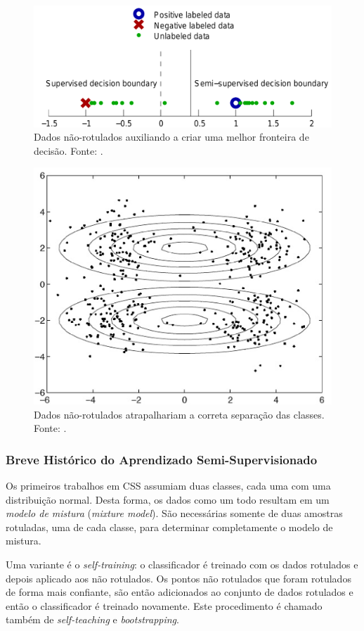\documentclass[12pt]{article}
\begin{document}
\begin{figure}[!h]
  \begin{center}
    \includegraphics[width=.45\textwidth]{ssl-help}
  \end{center}
  \caption{Dados não-rotulados auxiliando a criar uma melhor fronteira de decisão. Fonte: \cite{zhu1}.}
  \label{fig:help}
\end{figure}

\begin{figure}[!h]
  \begin{center}
    \includegraphics[width=.45\textwidth]{ssl-nhelp}
  \end{center}
  \caption{Dados não-rotulados atrapalhariam a correta separação das classes. Fonte: \cite{tub2008}.}
  \label{fig:nhelp}
\end{figure}


\subsubsection{Breve Histórico do Aprendizado Semi-Supervisionado}
Os primeiros trabalhos em CSS assumiam duas classes, cada uma com uma distribuição normal. Desta forma, os dados como um todo resultam em um \emph{modelo de mistura} (\emph{mixture model}). São necessárias somente de duas amostras rotuladas, uma de cada classe, para determinar completamente o modelo de mistura.

Uma variante é o \emph{self-training}: o classificador é treinado com os dados rotulados e depois aplicado aos não rotulados. Os pontos não rotulados que foram rotulados de forma mais confiante, são então adicionados ao conjunto de dados rotulados e então o classificador é treinado novamente. Este procedimento é chamado também de \emph{self-teaching} e \emph{bootstrapping}.
\end{document}
